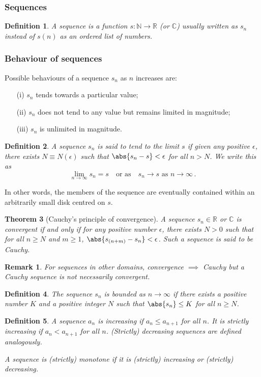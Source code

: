 \documentclass{article}
\theoremstyle{plain}\theoremheaderfont{\normalfont\itshape}\theorembodyfont{\rmfamily}\theoremseparator{.}\newtheorem*{rem}{Remark}\newtheorem*{ex}{Example}\newtheorem*{proof}{Proof}\newtheorem*{altp}{Alternative proof}
\theoremstyle{plain}\theoremheaderfont{\normalfont\bfseries}\theorembodyfont{\rmfamily}\theoremseparator{.}\newtheorem{thm}{Theorem}[section]\newtheorem{lem}[thm]{Lemma}\newtheorem{prop}[thm]{Proposition}\newtheorem*{cor}{Corollary}\newtheorem{defn}[thm]{Definition}\newtheorem{clm}[thm]{Claim}\newtheorem{clminproof}{Claim}
\theoremstyle{break}\theoremheaderfont{\normalfont\itshape}\theorembodyfont{\rmfamily}\theoremseparator{.\medskip}\newtheorem*{proofskip}{Proof}\newtheorem*{exs}{Examples}\newtheorem*{rems}{Remarks}
\theoremstyle{break}\theoremheaderfont{\normalfont\bfseries}\theorembodyfont{\rmfamily}\theoremseparator{.\medskip}\newtheorem{lemskip}[thm]{Lemma}\newtheorem{defnskip}[thm]{Definition}\newtheorem{propskip}[thm]{Proposition}\newtheorem{thmskip}[thm]{Theorem}
\numberwithin{equation}{section}
\begin{document}
	\subsubsection{Sequences}
	\begin{defn}
		A \textit{sequence} is a function \(s:\mathbb{N}\to\mathbb{R}\) (or \(\mathbb{C}\)) usually written as \(s_n\) instead of \(s(n)\) as an ordered list of numbers.
	\end{defn}
	\subsubsection{Behaviour of sequences}
	Possible behaviours of a sequence \(s_n\) as \(n\) increases are:
	\begin{enumerate}[topsep=0pt,leftmargin=30pt]
		\item[(i)] \(s_n\) tends towards a particular value;
		\item[(ii)] \(s_n\) does not tend to any value but remains limited in magnitude;
		\item[(iii)] \(s_n\) is unlimited in magnitude.
	\end{enumerate}

	\begin{defn}
		A sequence \(s_n\) is said to tend to the \textit{limit} \(s\) if given any positive \(\epsilon\), there exists \(N\equiv N(\epsilon)\) such that \(\abs{s_n-s}<\epsilon\) for all \(n>N\). We write this as
		\[\lim_{n\to\infty}s_n = s\quad\text{or as}\quad s_n\to s\text{ as }n\to\infty\,.\]
	\end{defn}
	In other words, the members of the sequence are eventually contained within an arbitrarily small disk centred on \(s\).
	\begin{thm}[Cauchy's principle of convergence]
		A sequence \(s_n\in\mathbb{R}\) or \(\mathbb{C}\) is convergent if and only if for any positive number \(\epsilon\), there exists \(N>0\) such that for all \(n\ge N\) and \(m\ge 1\), \(\abs{s_{(n+m)}-s_n}<\epsilon\). Such a sequence is said to be \textit{Cauchy}.
	\end{thm}
	\begin{rem}
		For sequences in other domains, convergence \(\implies\) Cauchy but a Cauchy sequence is not necessarily convergent.
	\end{rem}
	\begin{defn}
		The sequence \(s_n\) is \textit{bounded} as \(n\to\infty\) if there exists a positive number \(K\) and a positive integer \(N\) such that \(\abs{s_n}\le K\) for all \(n\ge N\).
	\end{defn}
	\begin{defn}
		A sequence \(a_n\) is \textit{increasing} if \(a_n\le a_{n+1}\) for all \(n\). It is \textit{strictly increasing} if \(a_n < a_{n+1}\) for all \(n\). \textit{(Strictly) decreasing} sequences are defined analogously.
		
		A sequence is \textit{(strictly) monotone} if it is (strictly) increasing or (strictly) decreasing.
	\end{defn}
\end{document}
